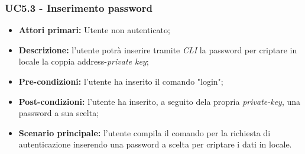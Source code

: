 \subsubsection{UC5.3 - Inserimento password}
\begin{itemize}
	\item \textbf{Attori primari:} Utente non autenticato;
	\item \textbf{Descrizione:} l'utente potrà inserire tramite \textit{CLI\glo} la password per criptare in locale la coppia address-\textit{private key\glos}; 
	\item \textbf{Pre-condizioni:} l'utente ha inserito il comando "login";
	\item \textbf{Post-condizioni:} l'utente ha inserito, a seguito dela propria \textit{private-key\glo}, una password a sua scelta;
	\item \textbf{Scenario principale:} l'utente compila il comando per la richiesta di autenticazione inserendo una password a scelta per criptare i dati in locale.
\end{itemize}
